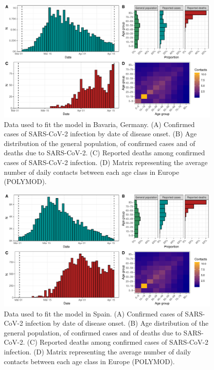 \documentclass{article}
\begin{document}
\begin{figure}[h]
		\centering
		\includegraphics[width=15cm]{../format_output/figures/data_bavaria.pdf}
		\caption{Data used to fit the model in Bavaria, Germany.  (A) Confirmed cases of SARS-CoV-2 infection by date of disease onset. (B) Age distribution of the general population, of confirmed cases and of deaths due to SARS-CoV-2. (C) Reported deaths among confirmed cases of SARS-CoV-2 infection. (D) Matrix representing the average number of daily contacts between each age class in Europe (POLYMOD).}
		\label{fig:bavaria}
\end{figure}

\begin{figure}[h]
		\centering
		\includegraphics[width=15cm]{../format_output/figures/data_spain.pdf}
		\caption{Data used to fit the model in Spain.  (A) Confirmed cases of SARS-CoV-2 infection by date of disease onset. (B) Age distribution of the general population, of confirmed cases and of deaths due to SARS-CoV-2. (C) Reported deaths among confirmed cases of SARS-CoV-2 infection. (D) Matrix representing the average number of daily contacts between each age class in Europe (POLYMOD).}
		\label{fig:spain}
\end{figure}
\end{document}

